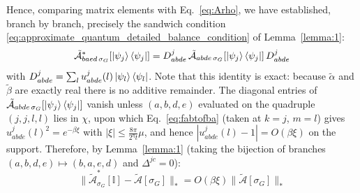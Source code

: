 \documentclass[aps,floatfix,10pt,amssymb,amsfont,amsmath,superscriptaddress,float,nofootinbib,longbibliography,nobalancelastpage,twocolumn]{revtex4-2}
\begin{document}
\begin{widetext}
\begin{equation}
    \label{eq:ufactorisation}
\end{equation}
Hence, comparing matrix elements with Eq.~\eqref{eq:Arho}, we have established, branch by branch, precisely the sandwich condition \eqref{eq:approximate_quantum_detailed_balance_condition} of Lemma~\ref{lemma:1}:
\begin{equation}
    \tilde{\mathcal{A}}^*_{baed\,\sigma_G}[\ket{\psi_j}\bra{\psi_j}] = D^{j}_{abde}\,\tilde{\mathcal{A}}_{abde\,\sigma_G}[\ket{\psi_j}\bra{\psi_j}]\,D^{j}_{abde}
    \label{eq:Asandwich}
\end{equation}
with $D^j_{abde} = \sum_l u^j_{abde}(l)\ket{\psi_l}\bra{\psi_l}$. Note that this identity is exact: because $\tilde\alpha$ and $\tilde\beta$ are exactly real there is no additive remainder. The diagonal entries of $\tilde{\mathcal{A}}_{abde\,\sigma_G}[\ket{\psi_j}\bra{\psi_j}]$ vanish unless $(a,b,d,e)$ evaluated on the quadruple $(j,j,l,l)$ lies in $\chi$, upon which Eq.~\eqref{eq:fabtofba} (taken at $k=j$, $m=l$) gives $u^j_{abde}(l)^2 = e^{-\beta\xi}$ with $|\xi| \leq \frac{8\pi}{2^{\eta}t}\mu$, and hence $|u^j_{abde}(l)-1| = O(\beta\xi)$ on the support. Therefore, by Lemma~\ref{lemma:1} (taking the bijection of branches $(a,b,d,e) \mapsto (b,a,e,d)$ and $\Delta^{jc} = 0$):
\begin{equation}
    \|\tilde{\mathcal{A}}^*_{\sigma_G}[\mathbb{I}] - \tilde{\mathcal{A}}[\sigma_G]\|_* = O(\beta \xi)\|\tilde{\mathcal{A}}[\sigma_G]\|_*
    \label{eq:Aoutput}
\end{equation}


\end{widetext}
\end{document}
